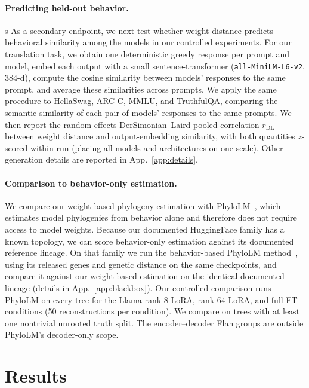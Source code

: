 \documentclass{article}
\theoremstyle{definition}
\theoremstyle{plain}
\begin{document}
\paragraph{Predicting held-out behavior.}
\label{sec:exp:behavioral}s
As a secondary endpoint, we next test whether weight distance predicts behavioral similarity among the models in our controlled experiments. For our translation task, we obtain one deterministic greedy response per prompt and model, embed each output with a small sentence-transformer (\texttt{all-MiniLM-L6-v2}, $384$-d), compute the cosine similarity between models' responses to the same prompt, and average these similarities across prompts. We apply the same procedure to HellaSwag, ARC-C, MMLU, and TruthfulQA, comparing the semantic similarity of each pair of models' responses to the same prompts. We then report the random-effects DerSimonian--Laird \citep{dersimonianlaird1986} pooled correlation $r_{\mathrm{DL}}$ between weight distance and output-embedding similarity, with both quantities $z$-scored within run (placing all models and architectures on one scale). Other generation details are reported in App.~\ref{app:details}.




\paragraph{Comparison to behavior-only estimation.}
\label{sec:exp:blackbox}
We compare our weight-based phylogeny estimation with PhyloLM~\citep{yax2025phylolm}, which estimates model phylogenies from behavior alone and therefore does not require access to model weights. Because our documented HuggingFace family has a known topology, we can score behavior-only estimation against its documented reference lineage. On that family we run the behavior-based PhyloLM method~\citep{yax2025phylolm}, using its released genes and genetic distance on the same checkpoints, and compare it against our weight-based estimation on the identical documented lineage (details in App.~\ref{app:blackbox}). Our controlled comparison runs PhyloLM on every tree for the Llama rank-8 LoRA, rank-64 LoRA, and full-FT conditions (50 reconstructions per condition). We compare on trees with at least one nontrivial unrooted truth split. The encoder--decoder Flan groups are outside PhyloLM's decoder-only scope.


\section{Results}
\label{sec:results}
\end{document}
